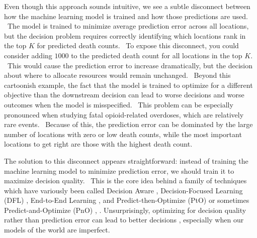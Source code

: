 Even though this approach sounds intuitive, we see a subtle disconnect between how the machine learning model is trained and how those predictions are used. \
The model is trained to minimize average prediction error across all locations, but the decision problem requires correctly identifying which locations rank in the top $K$ for predicted death counts. \
To expose this disconnect, you could consider adding $1000$ to the predicted death count for all locations in the top $K$. \
This would cause the prediction error to increase dramatically, but the decision about where to allocate resources would remain unchanged. \
Beyond this cartoonish example, the fact that the model is trained to optimize for a different objective than the downstream decision can lead to worse decisions and worse outcomes when the model is misspecified. \
This problem can be especially pronounced when studying fatal opioid-related overdoses, which are relatively rare events. \
Because of this, the prediction error can be dominated by the large number of locations with zero or low death counts, while the most important locations to get right are those with the highest death count.

The solution to this disconnect appears straightforward: instead of training the machine learning model to minimize prediction error, we should train it to maximize decision quality. \
This is the core idea behind a family of techniques which have variously been called Decision Aware \citep{chung_decision-aware_2022}, Decision-Focused Learning (DFL) \citep{wilderMeldingDatadecisionsPipeline2019}, End-to-End Learning \citep{dontiTaskbasedEndtoendModel2017, tangPyEPOPyTorchbasedEndtoend2024}, and Predict-then-Optimize (PtO) or sometimes Predict-and-Optimize (PnO) \citep{elmachtoubSmartPredictThen2022}, \citep{gengBenchmarkingPtOPnO2024}.
Unsurprisingly, optimizing for decision quality rather than prediction error can lead to better decisions \citep{elmachtoubEstimateThenOptimizeIntegratedEstimationOptimizationSample2025}, especially when our models of the world are imperfect. 

